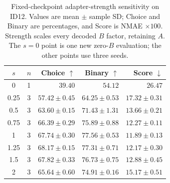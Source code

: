 \begin{table}[t]
\centering
\footnotesize
\setlength{\tabcolsep}{3pt}
\caption{Fixed-checkpoint adapter-strength sensitivity on ID12. Values are mean $\pm$ sample SD; Choice and Binary are percentages, and Score is NMAE $\times100$. Strength scales every decoded $B$ factor, retaining $A$. The $s=0$ point is one new zero-$B$ evaluation; the other points use three seeds.}
\label{tab:adapter-strength-id12}
\begin{tabular}{ccrrr}
\toprule
$s$ & $n$ & Choice $\uparrow$ & Binary $\uparrow$ & Score $\downarrow$ \\
\midrule
0 & 1 & $39.40$ & $54.12$ & $26.47$ \\
0.25 & 3 & $57.42 \pm 0.45$ & $64.25 \pm 0.53$ & $17.32 \pm 0.31$ \\
0.5 & 3 & $63.60 \pm 0.15$ & $71.43 \pm 1.31$ & $13.66 \pm 0.21$ \\
0.75 & 3 & $66.39 \pm 0.29$ & $75.89 \pm 0.88$ & $12.27 \pm 0.11$ \\
1 & 3 & $67.74 \pm 0.30$ & $77.56 \pm 0.53$ & $11.89 \pm 0.13$ \\
1.25 & 3 & $68.17 \pm 0.15$ & $77.31 \pm 0.71$ & $12.17 \pm 0.30$ \\
1.5 & 3 & $67.82 \pm 0.33$ & $76.73 \pm 0.75$ & $12.88 \pm 0.45$ \\
2 & 3 & $65.64 \pm 0.60$ & $74.91 \pm 0.16$ & $15.17 \pm 0.51$ \\
\bottomrule
\end{tabular}
\end{table}
